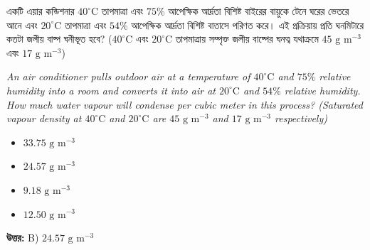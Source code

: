 \documentclass[12pt, a4paper]{article}
\begin{document}
\begin{tcolorbox}[questionbox={প্রশ্ন (Question) 4}]
    \noindent
    একটি এয়ার কন্ডিশনার $40^\circ\text{C}$ তাপমাত্রা এবং $75\%$ আপেক্ষিক আর্দ্রতা বিশিষ্ট বাইরের বায়ুকে টেনে ঘরের ভেতরে আনে এবং $20^\circ\text{C}$ তাপমাত্রা এবং $54\%$ আপেক্ষিক আর্দ্রতা বিশিষ্ট বাতাসে পরিণত করে। এই প্রক্রিয়ায় প্রতি ঘনমিটারে কতটা জলীয় বাষ্প ঘনীভূত হবে? ($40^\circ\text{C}$ এবং $20^\circ\text{C}$ তাপমাত্রায় সম্পৃক্ত জলীয় বাষ্পের ঘনত্ব যথাক্রমে $45\text{ g m}^{-3}$ এবং $17\text{ g m}^{-3}$)
    
    \vspace{0.8em}
    \begin{english}
    \noindent\textit{\color{darkgray}
    An air conditioner pulls outdoor air at a temperature of $40^\circ\text{C}$ and $75\%$ relative humidity into a room and converts it into air at $20^\circ\text{C}$ and $54\%$ relative humidity. How much water vapour will condense per cubic meter in this process? (Saturated vapour density at $40^\circ\text{C}$ and $20^\circ\text{C}$ are $45\text{ g m}^{-3}$ and $17\text{ g m}^{-3}$ respectively)
    }
    \end{english}
\end{tcolorbox}

\begin{itemize}[label={}, leftmargin=1cm, itemsep=0.5em]
    \item[\textbf{A)}] $33.75\text{ g m}^{-3}$
    \item[\textbf{B)}] $24.57\text{ g m}^{-3}$
    \item[\textbf{C)}] $9.18\text{ g m}^{-3}$
    \item[\textbf{D)}] $12.50\text{ g m}^{-3}$
\end{itemize}

\vspace{0.5em}
\begin{tcolorbox}[answerbox]
    \textbf{\color{success} উত্তর:} B) $24.57\text{ g m}^{-3}$
\end{tcolorbox}
\vspace{1em}
\end{document}
